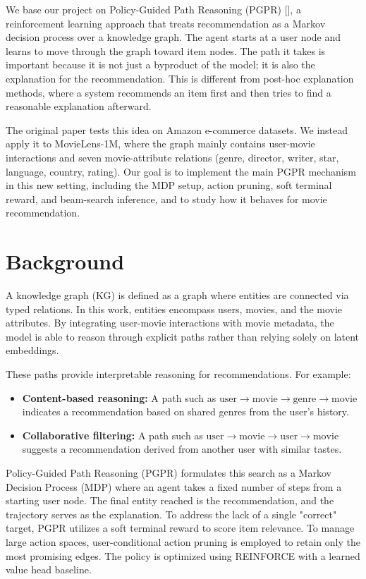 \documentclass{article}
\begin{document}
We base our project on Policy-Guided Path Reasoning (PGPR) [\cite{dapaper}], a reinforcement learning approach that treats recommendation as a Markov decision 
process over a knowledge graph. The agent starts at a user node and learns to move through the graph toward item nodes. The path it takes is important because it is not 
just a byproduct of the model; it is also the explanation for the recommendation. This is different from post-hoc explanation methods, where a system recommends an item 
first and then tries to find a reasonable explanation afterward.

The original paper tests this idea on Amazon e-commerce datasets. We instead apply it to MovieLens-1M, where the graph mainly contains user-movie interactions and seven 
movie-attribute relations (genre, director, writer, star, language, country, rating). Our goal is to implement the main PGPR mechanism in this new setting, including 
the MDP setup, action pruning, soft terminal reward, and beam-search inference, and to study how it behaves for movie recommendation.

\section{Background}
A knowledge graph (KG) is defined as a graph where entities are connected via typed relations. In this work, entities encompass users, movies, and the 
movie attributes. By integrating user-movie interactions with movie metadata, the model is able to reason through explicit paths rather than relying solely on latent embeddings. 

These paths provide interpretable reasoning for recommendations. For example:
\begin{itemize}
    \item \textbf{Content-based reasoning:} A path such as $\text{user} \to \text{movie} \to \text{genre} \to \text{movie}$ indicates a recommendation based on shared 
        genres from the user's history.
    \item \textbf{Collaborative filtering:} A path such as $\text{user} \to \text{movie} \to \text{user} \to \text{movie}$ suggests a recommendation derived from another 
        user with similar tastes.
\end{itemize}

Policy-Guided Path Reasoning (PGPR) formulates this search as a Markov Decision Process (MDP) where an agent takes a fixed number of steps from a starting user node. The 
final entity reached is the recommendation, and the trajectory serves as the explanation. To address the lack of a single "correct" target, PGPR utilizes a soft terminal 
reward to score item relevance. To manage large action spaces, user-conditional action pruning is employed to retain only the most promising edges. The policy is optimized 
using REINFORCE with a learned value head baseline.
\end{document}
